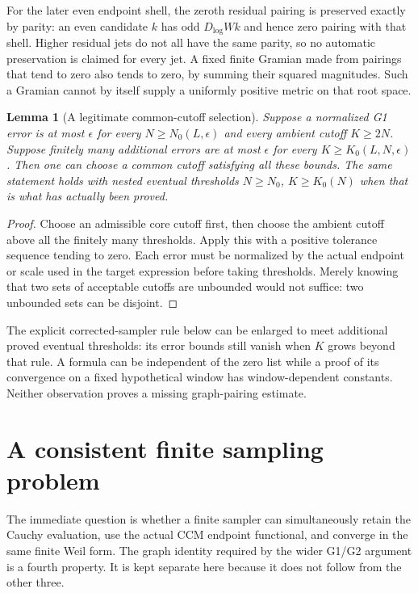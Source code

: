 \documentclass[11pt]{article}
\newtheorem{lemma}[theorem]{Lemma}
\theoremstyle{remark}
\begin{document}
For the later even endpoint shell, the zeroth residual pairing is preserved
exactly by parity: an even candidate $k$ has odd $D_{\log}Wk$ and hence
zero pairing with that shell. Higher residual jets do not all have the
same parity, so no automatic preservation is claimed for every jet.
A fixed finite Gramian made from pairings that tend to zero also tends to
zero, by summing their squared magnitudes. Such a Gramian cannot by itself
supply a uniformly positive metric on that root space.

\begin{lemma}[A legitimate common-cutoff selection]\label{lem:diagonal-selection}
Suppose a normalized G1 error is at most $\epsilon$ for every
$N\ge N_0(L,\epsilon)$ and every ambient cutoff $K\ge2N$.
Suppose finitely many additional errors are at most $\epsilon$ for every
$K\ge K_0(L,N,\epsilon)$. Then one can choose a common cutoff satisfying
all these bounds. The same statement holds with nested eventual thresholds
$N\ge N_0$, $K\ge K_0(N)$ when that is what has actually been proved.
\end{lemma}
\begin{proof}
Choose an admissible core cutoff first, then choose the ambient cutoff above
all the finitely many thresholds. Apply this with a positive tolerance
sequence tending to zero. Each error must be normalized by the actual
endpoint or scale used in the target expression before taking thresholds.
Merely knowing that two sets of acceptable cutoffs are unbounded would not
suffice: two unbounded sets can be disjoint.
\end{proof}
The explicit corrected-sampler rule below can be enlarged to meet additional
proved eventual thresholds: its error bounds still vanish when $K$ grows
beyond that rule. A formula can be independent of the zero list while a
proof of its convergence on a fixed hypothetical window has window-dependent
constants. Neither observation proves a missing graph-pairing estimate.
\section{A consistent finite sampling problem}\label{sec:sampling}

The immediate question is whether a finite sampler can simultaneously retain
the Cauchy evaluation, use the actual CCM endpoint functional, and converge
in the same finite Weil form. The graph identity required by the wider
G1/G2 argument is a fourth property. It is kept separate here because it
does not follow from the other three.
\end{document}
